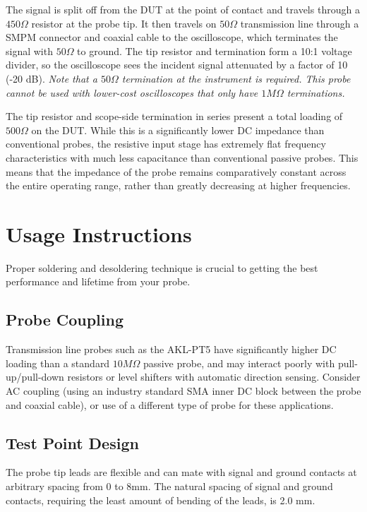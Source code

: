 \documentclass[11pt]{article}
\begin{document}
The signal is split off from the DUT at the point of contact and travels through a $450\Omega$ resistor at the
probe tip. It then travels on $50\Omega$ transmission line through a SMPM connector and coaxial cable to the
oscilloscope, which terminates the signal with $50\Omega$ to ground. The tip resistor and termination form a 10:1
voltage divider, so the oscilloscope sees the incident signal attenuated by a factor of 10 (-20 dB). \emph{Note that a
$50 \Omega$ termination at the instrument is required. This probe cannot be used with lower-cost oscilloscopes that
only have $1M \Omega$ terminations.}

The tip resistor and scope-side termination in series present a total loading of $500 \Omega$ on the DUT. While this is
a significantly lower DC impedance than conventional probes, the resistive input stage has extremely flat frequency
characteristics with much less capacitance than conventional passive probes. This means that the impedance of the probe
remains comparatively constant across the entire operating range, rather than greatly decreasing at higher frequencies.

\pagebreak

\section{Usage Instructions}

Proper soldering and desoldering technique is crucial to getting the best performance and lifetime from your probe.

\subsection{Probe Coupling}

Transmission line probes such as the AKL-PT5 have significantly higher DC loading than a standard $10M\Omega$ passive
probe, and may interact poorly with pull-up/pull-down resistors or level shifters with automatic direction sensing.
Consider AC coupling (using an industry standard SMA inner DC block between the probe and coaxial cable), or use of a
different type of probe for these applications.

\subsection{Test Point Design}

The probe tip leads are flexible and can mate with signal and ground contacts at arbitrary spacing from 0 to 8mm. The
natural spacing of signal and ground contacts, requiring the least amount of bending of the leads, is 2.0 mm.
\end{document}
